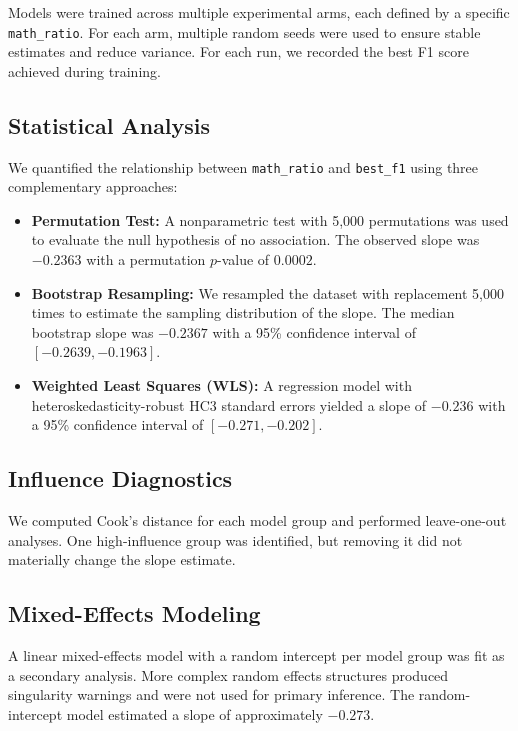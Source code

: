 \documentclass[11pt]{article}
\begin{document}
Models were trained across multiple experimental arms, each defined by a specific \texttt{math\_ratio}. For each arm, multiple random seeds were used to ensure stable estimates and reduce variance. For each run, we recorded the best F1 score achieved during training.

\subsection{Statistical Analysis}

We quantified the relationship between \texttt{math\_ratio} and \texttt{best\_f1} using three complementary approaches:

\begin{itemize}
    \item \textbf{Permutation Test:} A nonparametric test with 5{,}000 permutations was used to evaluate the null hypothesis of no association. The observed slope was $-0.2363$ with a permutation $p$-value of $0.0002$.
    \item \textbf{Bootstrap Resampling:} We resampled the dataset with replacement 5{,}000 times to estimate the sampling distribution of the slope. The median bootstrap slope was $-0.2367$ with a 95\% confidence interval of $[-0.2639, -0.1963]$.
    \item \textbf{Weighted Least Squares (WLS):} A regression model with heteroskedasticity-robust HC3 standard errors yielded a slope of $-0.236$ with a 95\% confidence interval of $[-0.271, -0.202]$.
\end{itemize}

\subsection{Influence Diagnostics}

We computed Cook's distance for each model group and performed leave-one-out analyses. One high-influence group was identified, but removing it did not materially change the slope estimate.

\subsection{Mixed-Effects Modeling}

A linear mixed-effects model with a random intercept per model group was fit as a secondary analysis. More complex random effects structures produced singularity warnings and were not used for primary inference. The random-intercept model estimated a slope of approximately $-0.273$.
\end{document}
